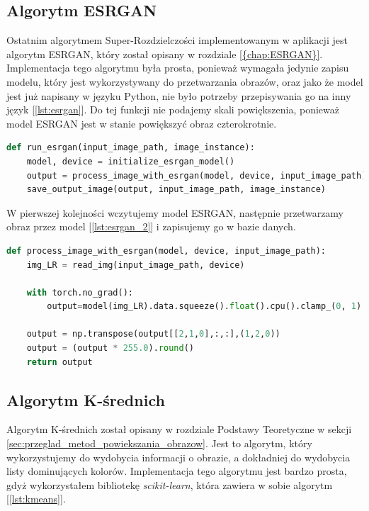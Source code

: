 \subsection*{Algorytm ESRGAN}

Ostatnim algorytmem Super-Rozdzielczości implementowanym w aplikacji jest algorytm ESRGAN, który został opisany w rozdziale \ref{{chap:ESRGAN}}.
Implementacja tego algorytmu była prosta, ponieważ wymagała jedynie zapisu modelu, który jest wykorzystywany do przetwarzania obrazów, oraz jako że model jest już napisany w języku Python, nie było potrzeby przepisywania go na inny język [\ref{lst:esrgan}]. Do tej funkcji nie podajemy skali powiększenia, ponieważ model ESRGAN jest w stanie powiększyć obraz czterokrotnie.

\begin{lstlisting}[language=Python, caption=Implementacja algorytmu ESRGAN., label={lst:esrgan}]    
def run_esrgan(input_image_path, image_instance):
    model, device = initialize_esrgan_model()
    output = process_image_with_esrgan(model, device, input_image_path)
    save_output_image(output, input_image_path, image_instance)
\end{lstlisting}

W pierwszej kolejności wczytujemy model ESRGAN, następnie przetwarzamy obraz przez model [\ref{lst:esrgan_2}] i zapisujemy go w bazie danych.


\begin{lstlisting}[language=Python, caption=Przetwarzanie przez model ESRGAN., label={lst:esrgan_2}]
def process_image_with_esrgan(model, device, input_image_path):
    img_LR = read_img(input_image_path, device)

    with torch.no_grad():
        output=model(img_LR).data.squeeze().float().cpu().clamp_(0, 1).numpy()
    
    output = np.transpose(output[[2,1,0],:,:],(1,2,0))
    output = (output * 255.0).round()
    return output
\end{lstlisting}


\subsection*{Algorytm K-średnich}

Algorytm K-średnich został opisany w rozdziale Podstawy Teoretyczne w sekcji \ref{sec:przeglad_metod_powiekszania_obrazow}.
Jest to algorytm, który wykorzystujemy do wydobycia informacji o obrazie, a dokładniej do wydobycia listy dominujących kolorów. Implementacja tego algorytmu jest bardzo prosta, gdyż wykorzystałem bibliotekę \textit{scikit-learn}, która zawiera w sobie algorytm [\ref{lst:kmeans}].

